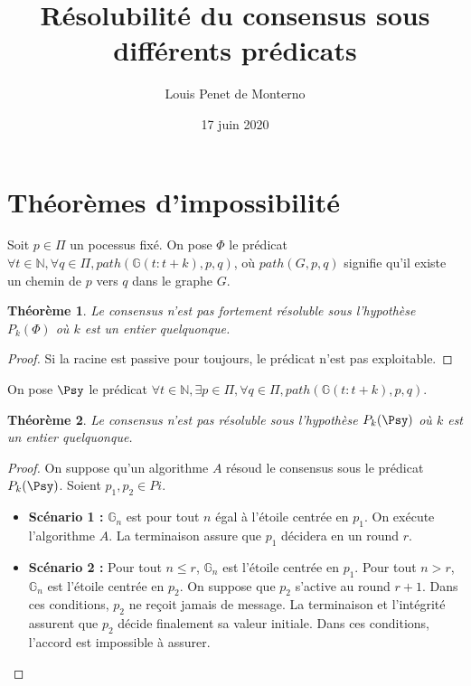\documentclass{article}
\title{Résolubilité du consensus sous différents prédicats}
\date{17 juin 2020}
\author{Louis Penet de Monterno}
\newtheorem{theorem}{Théorème}
\begin{document}
\maketitle

\section{Théorèmes d'impossibilité}

Soit $p \in \Pi$ un pocessus fixé.
On pose $\Phi$ le prédicat $\forall t \in \mathds{N}, \forall q \in \Pi, path(\mathds{G}(t : t+k), p, q)$, où $path(G, p, q)$ signifie qu'il existe un chemin de $p$ vers $q$ dans le graphe $G$.

\begin{theorem}
	Le consensus n'est pas fortement résoluble sous l'hypothèse $P_k(\Phi)$ où $k$ est un entier quelquonque.
\end{theorem}
\begin{proof}
	Si la racine est passive pour toujours, le prédicat n'est pas exploitable.
\end{proof}

On pose $\Psy$ le prédicat $\forall t \in \mathds{N}, \exists p \in \Pi, \forall q \in \Pi, path(\mathds{G}(t : t+k), p, q)$.
\begin{theorem}
	Le consensus n'est pas résoluble sous l'hypothèse $P_k(\Psy)$ où $k$ est un entier quelquonque.
\end{theorem}
\begin{proof}
	On suppose qu'un algorithme $A$ résoud le consensus sous le prédicat $P_k(\Psy)$. Soient $p_1, p_2 \in Pi$.
	\begin{itemize}

		\item \textbf{Scénario 1 :} $\mathds{G}_n$ est pour tout $n$ égal à l'étoile centrée en $p_1$. On exécute l'algorithme $A$. La terminaison assure que $p_1$ décidera en un round $r$.
		\item \textbf{Scénario 2 :} Pour tout $n \leq r$, $\mathds{G}_n$ est l'étoile centrée en $p_1$. Pour tout $n > r$, $\mathds{G}_n$ est l'étoile centrée en $p_2$. On suppose que $p_2$
			s'active au round $r+1$. Dans ces conditions, $p_2$ ne reçoit jamais de message. La terminaison et l'intégrité assurent que $p_2$ décide finalement sa valeur initiale.
			Dans ces conditions, l'accord est impossible à assurer.

	\end{itemize}
\end{proof}
\end{document}
